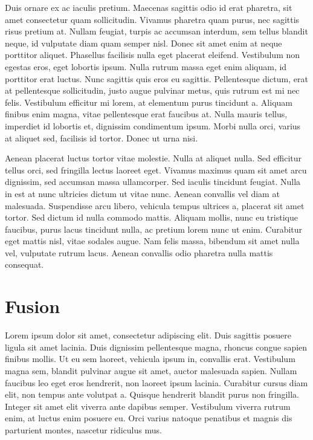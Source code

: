 \documentclass[
  letterpaper,
  DIV=11,
  numbers=noendperiod]{scrreprt}
\begin{document}
Duis ornare ex ac iaculis pretium. Maecenas sagittis odio id erat
pharetra, sit amet consectetur quam sollicitudin. Vivamus pharetra quam
purus, nec sagittis risus pretium at. Nullam feugiat, turpis ac accumsan
interdum, sem tellus blandit neque, id vulputate diam quam semper nisl.
Donec sit amet enim at neque porttitor aliquet. Phasellus facilisis
nulla eget placerat eleifend. Vestibulum non egestas eros, eget lobortis
ipsum. Nulla rutrum massa eget enim aliquam, id porttitor erat luctus.
Nunc sagittis quis eros eu sagittis. Pellentesque dictum, erat at
pellentesque sollicitudin, justo augue pulvinar metus, quis rutrum est
mi nec felis. Vestibulum efficitur mi lorem, at elementum purus
tincidunt a. Aliquam finibus enim magna, vitae pellentesque erat
faucibus at. Nulla mauris tellus, imperdiet id lobortis et, dignissim
condimentum ipsum. Morbi nulla orci, varius at aliquet sed, facilisis id
tortor. Donec ut urna nisi.

Aenean placerat luctus tortor vitae molestie. Nulla at aliquet nulla.
Sed efficitur tellus orci, sed fringilla lectus laoreet eget. Vivamus
maximus quam sit amet arcu dignissim, sed accumsan massa ullamcorper.
Sed iaculis tincidunt feugiat. Nulla in est at nunc ultricies dictum ut
vitae nunc. Aenean convallis vel diam at malesuada. Suspendisse arcu
libero, vehicula tempus ultrices a, placerat sit amet tortor. Sed dictum
id nulla commodo mattis. Aliquam mollis, nunc eu tristique faucibus,
purus lacus tincidunt nulla, ac pretium lorem nunc ut enim. Curabitur
eget mattis nisl, vitae sodales augue. Nam felis massa, bibendum sit
amet nulla vel, vulputate rutrum lacus. Aenean convallis odio pharetra
nulla mattis consequat.


\chapter{Fusion}\label{fusion}

Lorem ipsum dolor sit amet, consectetur adipiscing elit. Duis sagittis
posuere ligula sit amet lacinia. Duis dignissim pellentesque magna,
rhoncus congue sapien finibus mollis. Ut eu sem laoreet, vehicula ipsum
in, convallis erat. Vestibulum magna sem, blandit pulvinar augue sit
amet, auctor malesuada sapien. Nullam faucibus leo eget eros hendrerit,
non laoreet ipsum lacinia. Curabitur cursus diam elit, non tempus ante
volutpat a. Quisque hendrerit blandit purus non fringilla. Integer sit
amet elit viverra ante dapibus semper. Vestibulum viverra rutrum enim,
at luctus enim posuere eu. Orci varius natoque penatibus et magnis dis
parturient montes, nascetur ridiculus mus.
\end{document}
